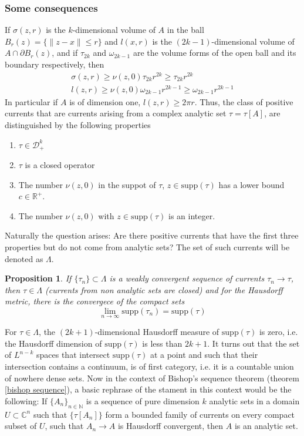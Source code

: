 \documentclass[12pt,twoside,a4paper]{report}
\newtheorem{prop}[theorem]{Proposition}
\newcommand{\nat}{\ensuremath{ \mathbb N }}
\newcommand{\con}{\ensuremath{\mathbb{C}^n}}
\newcommand{\dsheaf}{\ensuremath{\mathcal D }}
\begin{document}
\subsubsection{Some consequences}
If $\sigma(z,r)$ is the $k$-dimensional volume of $A$ in the ball $B_r(z)=\{\|z-x\|\leq r\}$ and $l(x,r)$ is the $(2k-1)$-dimensional volume of $A\cap\partial B_r(z)$, and if $\tau_{2k}$ and $\omega_{2k-1}$ are the volume forms of the open ball and its boundary respectively, then
\begin{align*}
\sigma(z,r)\geq\nu(z,0)\tau_{2k}r^{2k}\geq\tau_{2k}r^{2k}\\
l(z,r)\geq\nu(z,0)\omega_{2k-1}r^{2k-1}\geq\omega_{2k-1}r^{2k-1}
\end{align*}
\noindent In particular if $A$ is of dimension one, $l(z,r)\geq2\pi r$.
Thus, the class of positive currents that are currents arising from a complex analytic set $\tau=\tau[A]$, are distinguished by the following properties
\begin{enumerate}
\item $\tau\in\dsheaf^k_{+}$ 
\item $\tau$ is a closed operator
\item The number $\nu(z,0)$ in the suppot of $\tau$, $z\in \mathrm{supp}(\tau)$ has a lower bound $c\in\mathbb{R}^{+}$.
\item The number $\nu(z,0)$ with $z\in \mathrm{supp}(\tau)$ is an integer.
\end{enumerate}

Naturally the question arises: Are there positive currents that have the first three properties but do not come from analytic sets? The set of such currents will be denoted as $\Lambda$.

\begin{prop}
  If $\{\tau_n\}\subset\Lambda$ is a weakly convergent sequence of currents $\tau_n\rightarrow\tau$, then $\tau\in\Lambda$ (currents from non analytic sets are closed) and for the Hausdorff metric, there is the convergece of the compact sets
  \[
    \lim_{n\to\infty} \mathrm{supp}(\tau_n)=\mathrm{supp}(\tau)
\]
\end{prop}

For $\tau\in\Lambda$, the $(2k+1)$-dimensional Hausdorff measure of $\mathrm{supp}(\tau)$ is zero, i.e. the Hausdorff dimension of $\mathrm{supp}(\tau)$ is less than $2k+1$. It turns out that the set of $L^{n-k}$ spaces that intersect $\mathrm{supp}(\tau)$ at a point and such that their intersection contains a continuum, is of first category, i.e. it is a countable union of nowhere dense sets. Now in the context of Bishop's sequence theorem (theorem \ref{bishop sequence}), a basic rephrase of the stament in this context would be the following: If $\{A_n\}_{n\in\nat}$ is a sequence of pure dimension $k$ analytic sets in a domain $U\subset\con$ such that $\{\tau[A_n]\}$ form a bounded family of currents on every compact subset of \(U\), such that $A_n\rightarrow A$ is Hausdorff convergent, then $A$ is an analytic set.
\end{document}

